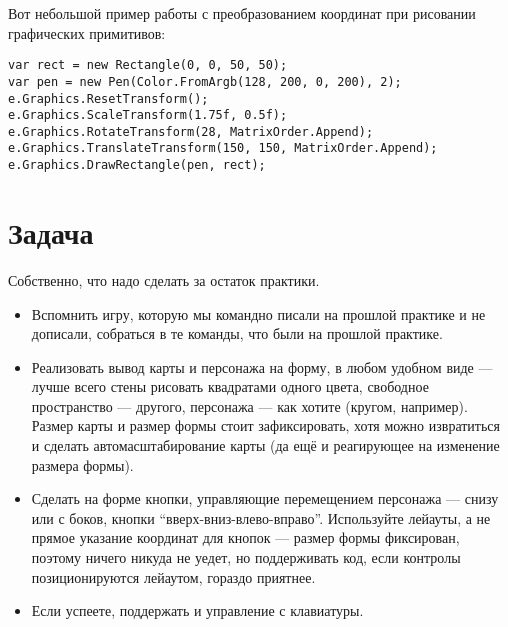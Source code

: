 \documentclass{../../text-style}
\begin{document}
Вот небольшой пример работы с преобразованием координат при рисовании графических примитивов:

\begin{verbatim}
var rect = new Rectangle(0, 0, 50, 50);
var pen = new Pen(Color.FromArgb(128, 200, 0, 200), 2);
e.Graphics.ResetTransform();
e.Graphics.ScaleTransform(1.75f, 0.5f);
e.Graphics.RotateTransform(28, MatrixOrder.Append);
e.Graphics.TranslateTransform(150, 150, MatrixOrder.Append);
e.Graphics.DrawRectangle(pen, rect);
\end{verbatim}

\section{Задача}

Собственно, что надо сделать за остаток практики.

\begin{itemize}
    \item Вспомнить игру, которую мы командно писали на прошлой практике и не дописали, собраться в те команды, что были на прошлой практике.
    \item Реализовать вывод карты и персонажа на форму, в любом удобном виде --- лучше всего стены рисовать квадратами одного цвета, свободное пространство --- другого, персонажа --- как хотите (кругом, например).
        Размер карты и размер формы стоит зафиксировать, хотя можно извратиться и сделать автомасштабирование карты (да ещё и реагирующее на изменение размера формы).
    \item Сделать на форме кнопки, управляющие перемещением персонажа --- снизу или с боков, кнопки \enquote{вверх-вниз-влево-вправо}.
        Используйте лейауты, а не прямое указание координат для кнопок --- размер формы фиксирован, поэтому ничего никуда не уедет, но поддерживать код, если контролы позиционируются лейаутом, гораздо приятнее.
    \item Если успеете, поддержать и управление с клавиатуры.
\end{itemize}
\end{document}
